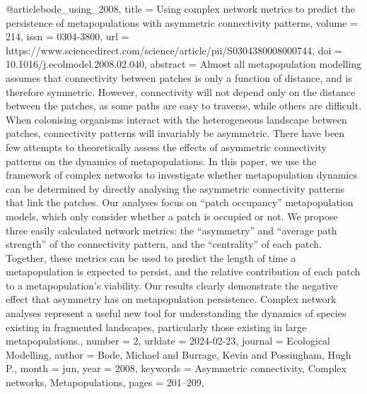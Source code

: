 {{{{@article{bode_using_2008,
	title = {Using complex network metrics to predict the persistence of metapopulations with asymmetric connectivity patterns},
	volume = {214},
	issn = {0304-3800},
	url = {https://www.sciencedirect.com/science/article/pii/S0304380008000744},
	doi = {10.1016/j.ecolmodel.2008.02.040},
	abstract = {Almost all metapopulation modelling assumes that connectivity between patches is only a function of distance, and is therefore symmetric. However, connectivity will not depend only on the distance between the patches, as some paths are easy to traverse, while others are difficult. When colonising organisms interact with the heterogeneous landscape between patches, connectivity patterns will invariably be asymmetric. There have been few attempts to theoretically assess the effects of asymmetric connectivity patterns on the dynamics of metapopulations. In this paper, we use the framework of complex networks to investigate whether metapopulation dynamics can be determined by directly analysing the asymmetric connectivity patterns that link the patches. Our analyses focus on “patch occupancy” metapopulation models, which only consider whether a patch is occupied or not. We propose three easily calculated network metrics: the “asymmetry” and “average path strength” of the connectivity pattern, and the “centrality” of each patch. Together, these metrics can be used to predict the length of time a metapopulation is expected to persist, and the relative contribution of each patch to a metapopulation's viability. Our results clearly demonstrate the negative effect that asymmetry has on metapopulation persistence. Complex network analyses represent a useful new tool for understanding the dynamics of species existing in fragmented landscapes, particularly those existing in large metapopulations.},
	number = {2},
	urldate = {2024-02-23},
	journal = {Ecological Modelling},
	author = {Bode, Michael and Burrage, Kevin and Possingham, Hugh P.},
	month = jun,
	year = {2008},
	keywords = {Asymmetric connectivity, Complex networks, Metapopulations},
	pages = {201--209},
}

}}}}
